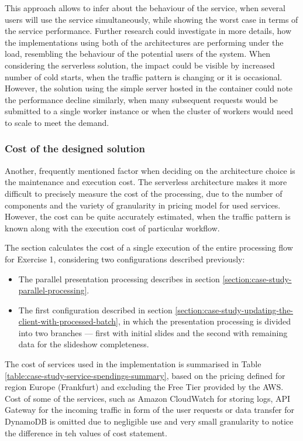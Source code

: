 \begin{itemize}
    This approach allows to infer about the behaviour of the service, when several users will use the service simultaneously, while showing the worst case in terms of the service performance.
    Further research could investigate in more details, how the implementations using both of the architectures are performing under the load, resembling the behaviour of the potential users of the system.
    When considering the serverless solution, the impact could be visible by increased number of cold starts, when the traffic pattern is changing or it is occasional. However, the solution using the simple server hosted in the container could note the performance decline similarly, when many subsequent requests would be submitted to a single worker instance or when the cluster of workers would need to scale to meet the demand.
\end{itemize}

\subsubsection{Cost of the designed solution}

Another, frequently mentioned factor when deciding on the architecture choice is the maintenance and execution cost. The serverless architecture makes it more difficult to precisely measure the cost of the processing, due to the number of components and the variety of granularity in pricing model for used services. However, the cost can be quite accurately estimated, when the traffic pattern is known along with the execution cost of particular workflow.

The section calculates the cost of a single execution of the entire processing flow for Exercise 1, considering two configurations described previously:

\begin{itemize}
   \item The parallel presentation processing describes in section \ref{section:case-study-parallel-processing}.
   \item The first configuration described in section \ref{section:case-study-updating-the-client-with-processed-batch}, in which the presentation processing is divided into two branches --- first with initial slides and the second with remaining data for the slideshow completeness.
\end{itemize}

The cost of services used in the implementation is summarised in Table \ref{table:case-study-service-spendings-summary}, based on the pricing defined for region Europe (Frankfurt) and excluding the Free Tier provided by the AWS.
Cost of some of the services, such as Amazon CloudWatch for storing logs, API Gateway for the incoming traffic in form of the user requests or data transfer for DynamoDB is omitted due to negligible use and very small granularity to notice the difference in teh values of cost statement.

